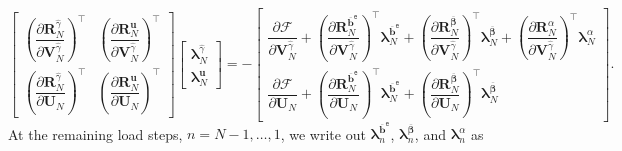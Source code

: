 \documentclass[preprint,11pt]{elsarticle}
\theoremstyle{definition}
\begin{document}
\begin{equation} \label{Reduced Adjoint Equation at Final Step}
    \left[ \begin{array}{cc}
        \left( \dfrac{\partial \mathbf{R}_N^{\widehat{\gamma}}}{\partial \mathbf{V}_N^{\widehat{\gamma}}} \right)^\top
        & \left( \dfrac{\partial \mathbf{R}_N^\mathbf{u}}{\partial \mathbf{V}_N^{\widehat{\gamma}}} \right)^\top \\[12pt]
        \left( \dfrac{\partial \mathbf{R}_N^{\widehat{\gamma}}}{\partial \mathbf{U}_N} \right)^\top
        & \left( \dfrac{\partial \mathbf{R}_N^\mathbf{u}}{\partial \mathbf{U}_N} \right)^\top
    \end{array} \right]
    \left[ \begin{array}{c}
        \boldsymbol{\lambda}_N^{\widehat{\gamma}} \\[12pt]
        \boldsymbol{\lambda}_N^\mathbf{u}
    \end{array} \right]
    = - \left[ \begin{array}{c}
         \dfrac{\partial \mathcal{F}}{\partial \mathbf{V}_N^{\widehat{\gamma}}}
         + \left( \dfrac{\partial \mathbf{R}_N^{\overline{\mathbf{b}}^\texttt{e}}}{\partial \mathbf{V}_N^{\widehat{\gamma}}} \right)^\top \boldsymbol{\lambda}_N^{\overline{\mathbf{b}}^\texttt{e}}
         + \left( \dfrac{\partial \mathbf{R}_N^{\overline{\boldsymbol{\beta}}}}{\partial \mathbf{V}_N^{\widehat{\gamma}}} \right)^\top \boldsymbol{\lambda}_N^{\overline{\boldsymbol{\beta}}}
         + \left( \dfrac{\partial \mathbf{R}_N^\alpha}{\partial \mathbf{V}_N^{\widehat{\gamma}}} \right)^\top \boldsymbol{\lambda}_N^\alpha \\[12pt]
         \dfrac{\partial \mathcal{F}}{\partial \mathbf{U}_N}
         + \left( \dfrac{\partial \mathbf{R}_N^{\overline{\mathbf{b}}^\texttt{e}}}{\partial \mathbf{U}_N} \right)^\top \boldsymbol{\lambda}_N^{\overline{\mathbf{b}}^\texttt{e}}
         + \left( \dfrac{\partial \mathbf{R}_N^{\overline{\boldsymbol{\beta}}}}{\partial \mathbf{U}_N} \right)^\top \boldsymbol{\lambda}_N^{\overline{\boldsymbol{\beta}}}
    \end{array} \right].
\end{equation}
At the remaining load steps, $n = N-1, \ldots, 1$, we write out $\boldsymbol{\lambda}_n^{\overline{\mathbf{b}}^\texttt{e}}$, $\boldsymbol{\lambda}_n^{\overline{\boldsymbol{\beta}}}$, and $\boldsymbol{\lambda}_n^\alpha$ as
\end{document}
